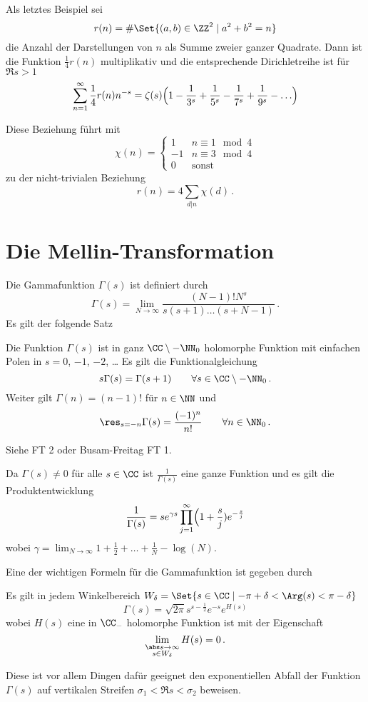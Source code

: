 Als letztes Beispiel sei
\[
	r(n) = \# \Set{ (a,b) \in \ZZ^2 \mid a^2 + b^2 = n}
\]
die Anzahl der Darstellungen von $n$ als Summe zweier ganzer Quadrate.
Dann ist die Funktion $\frac{1}{4}r(n)$ multiplikativ und die entsprechende Dirichletreihe ist für $\Re s > 1$
\[
	\sum_{n=1}^\infty \frac{1}{4} r(n) n^{-s}
	= \zeta(s) \Bigl( 1 - \frac{1}{3^s} + \frac{1}{5^s} - \frac{1}{7^s} + \frac{1}{9^s} - \ldots \Bigr)
\]

Diese Beziehung führt mit 
\[
	\chi(n)
	= \begin{cases}
		1 & n \equiv 1 \mod 4 \\
		-1 & n \equiv 3 \mod 4 \\
		0 & \text{sonst}
	\end{cases}
\]
zu der nicht-trivialen Beziehung
\[
	r(n) = 4\sum_{d|n} \chi(d)
	\,.
\]

\section{Die Mellin-Transformation}

\begin{erin}
	Die Gammafunktion $\Gamma(s)$ ist definiert durch
	\[
		\Gamma(s) = \lim_{N\to\infty} \frac{(N-1)!N^s}{s(s+1) \ldots (s+N-1)}\,.
	\]
	Es gilt der folgende Satz
	\begin{satz}
		Die Funktion $\Gamma(s)$ ist in ganz $\CC\setminus-\NN_0$ holomorphe Funktion mit einfachen Polen in $s=0$, $-1$, $-2$, \ldots{}
		Es gilt die Funktionalgleichung
		\[
			s\Gamma(s) = \Gamma(s+1) \qquad \forall s \in \CC\setminus-\NN_0\,.
		\]
		Weiter gilt $\Gamma(n) = (n-1)!$ für $n \in \NN$ und
		\[
			\res_{s=-n} \Gamma(s) = \frac{(-1)^n}{n!}
			\qquad \forall n \in \NN_0\,.
		\]
	\end{satz}
	\begin{bewe}
		Siehe FT 2 oder Busam-Freitag FT 1.
	\end{bewe}

	Da $\Gamma(s) \not= 0$ für alle $s \in \CC$ ist $\frac{1}{\Gamma(s)}$ eine ganze Funktion und es gilt die Produktentwicklung
	\[
		\frac{1}{\Gamma(s)} = s e^{\gamma s} \prod_{j=1}^\infty \Bigl(1 + \frac{s}{j})e^{-\frac{s}{j}}
	\]
	wobei $\gamma = \lim_{N \to \infty} 1 + \frac{1}{2} + \ldots + \frac{1}{N} - \log(N)$.
	
	Eine der wichtigen Formeln für die Gammafunktion ist gegeben durch
	\begin{satz}
		Es gilt in jedem Winkelbereich $W_\delta = \Set{s \in \CC \mid -\pi + \delta < \Arg(s) < \pi - \delta}$
		\[
			\Gamma(s)
			= \sqrt{2\pi} s^{s - \frac{1}{2}} e^{-s} e^{H(s)}
		\]
		wobei $H(s)$ eine in $\CC_-$ holomorphe Funktion ist mit der Eigenschaft
		\[
			\lim_{\substack{\abs s \to \infty \\ s \in W_\delta}} H(s) = 0\,.
		\]
	\end{satz}
	Diese ist vor allem Dingen dafür geeignet den exponentiellen Abfall der Funktion $\Gamma(s)$ auf vertikalen Streifen $\sigma_1 < \Re s < \sigma_2$ beweisen.
\end{erin}
